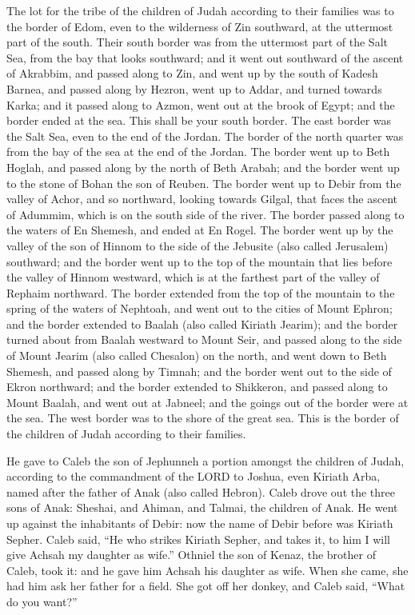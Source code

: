  The lot for the tribe of the children of Judah according
to their families was to the border of Edom, even to the wilderness of
Zin southward, at the uttermost part of the south.  Their
south border was from the uttermost part of the Salt Sea, from the bay
that looks southward;  and it went out southward of the
ascent of Akrabbim, and passed along to Zin, and went up by the south of
Kadesh Barnea, and passed along by Hezron, went up to Addar, and turned
towards Karka;  and it passed along to Azmon, went out at
the brook of Egypt; and the border ended at the sea. This shall be your
south border.  The east border was the Salt Sea, even to
the end of the Jordan. The border of the north quarter was from the bay
of the sea at the end of the Jordan.  The border went up
to Beth Hoglah, and passed along by the north of Beth Arabah; and the
border went up to the stone of Bohan the son of Reuben. 
The border went up to Debir from the valley of Achor, and so northward,
looking towards Gilgal, that faces the ascent of Adummim, which is on
the south side of the river. The border passed along to the waters of En
Shemesh, and ended at En Rogel.  The border went up by the
valley of the son of Hinnom to the side of the Jebusite (also called
Jerusalem) southward; and the border went up to the top of the mountain
that lies before the valley of Hinnom westward, which is at the farthest
part of the valley of Rephaim northward.  The border
extended from the top of the mountain to the spring of the waters of
Nephtoah, and went out to the cities of Mount Ephron; and the border
extended to Baalah (also called Kiriath Jearim);  and the
border turned about from Baalah westward to Mount Seir, and passed along
to the side of Mount Jearim (also called Chesalon) on the north, and
went down to Beth Shemesh, and passed along by Timnah; 
and the border went out to the side of Ekron northward; and the border
extended to Shikkeron, and passed along to Mount Baalah, and went out at
Jabneel; and the goings out of the border were at the sea.
 The west border was to the shore of the great sea. This
is the border of the children of Judah according to their families.

 He gave to Caleb the son of Jephunneh a portion amongst
the children of Judah, according to the commandment of the LORD to
Joshua, even Kiriath Arba, named after the father of Anak (also called
Hebron).  Caleb drove out the three sons of Anak:
Sheshai, and Ahiman, and Talmai, the children of Anak. 
He went up against the inhabitants of Debir: now the name of Debir
before was Kiriath Sepher.  Caleb said, ``He who strikes
Kiriath Sepher, and takes it, to him I will give Achsah my daughter as
wife.''  Othniel the son of Kenaz, the brother of Caleb,
took it: and he gave him Achsah his daughter as wife. 
When she came, she had him ask her father for a field. She got off her
donkey, and Caleb said, ``What do you want?''

